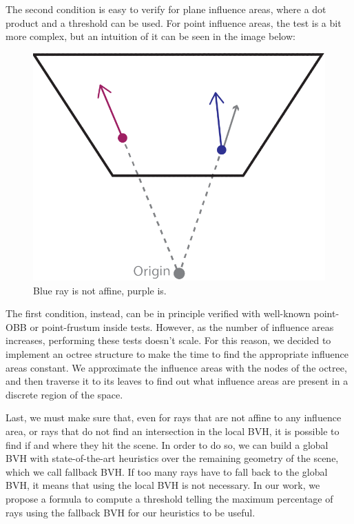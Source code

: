 \documentclass[11pt,a4paper,twocolumn]{article}
\begin{document}
The second condition is easy to verify for plane influence areas, where a dot product and a threshold can be used. For point influence areas, the test is a bit more complex, but an intuition of it can be seen in the image below:

\begin{figure}[H]
    \centering
    \includegraphics[width=\textwidth*\real{0.2}]{Images/direction_affinity.png}
    \caption{Blue ray is not affine, purple is.}
    \label{fig:direction_affinity}
\end{figure}

The first condition, instead, can be in principle verified with well-known point-OBB or point-frustum inside tests. However, as the number of influence areas increases, performing these tests doesn't scale. For this reason, we decided to implement an octree structure to make the time to find the appropriate influence areas constant. We approximate the influence areas with the nodes of the octree, and then traverse it to its leaves to find out what influence areas are present in a discrete region of the space.

Last, we must make sure that, even for rays that are not affine to any influence area, or rays that do not find an intersection in the local BVH, it is possible to find if and where they hit the scene. In order to do so, we can build a global BVH with state-of-the-art heuristics over the remaining geometry of the scene, which we call fallback BVH. If too many rays have to fall back to the global BVH, it means that using the local BVH is not necessary. In our work, we propose a formula to compute a threshold telling the maximum percentage of rays using the fallback BVH for our heuristics to be useful.
\end{document}
